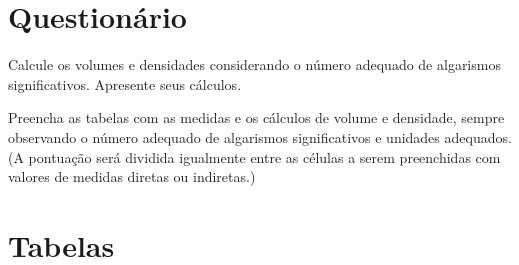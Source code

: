 \vspace{5mm}

\section{Questionário}

\begin{question}[type={exam}]
Calcule os volumes e densidades considerando o número adequado de algarismos significativos. Apresente seus cálculos.
\end{question}

\begin{question}[type={exam}]
Preencha as tabelas com as medidas e os cálculos de volume e densidade, sempre observando o número adequado de algarismos significativos e unidades adequados. (A pontuação será dividida igualmente entre as células a serem preenchidas com valores de medidas diretas ou indiretas.)
\end{question}


\vfill
\pagebreak
\section{Tabelas}


